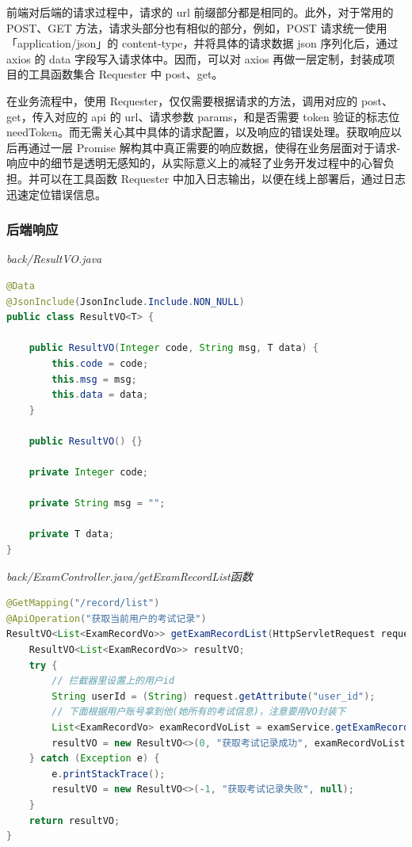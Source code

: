 前端对后端的请求过程中，请求的 url 前缀部分都是相同的。此外，对于常用的 POST、GET 方法，请求头部分也有相似的部分，例如，POST 请求统一使用「application/json」的 content-type，并将具体的请求数据 json 序列化后，通过 axios 的 data 字段写入请求体中。因而，可以对 axios 再做一层定制，封装成项目的工具函数集合 Requester 中 post、get。

在业务流程中，使用 Requester，仅仅需要根据请求的方法，调用对应的 post、get，传入对应的 api 的 url、请求参数 params，和是否需要 token 验证的标志位 needToken。而无需关心其中具体的请求配置，以及响应的错误处理。获取响应以后再通过一层 Promise 解构其中真正需要的响应数据，使得在业务层面对于请求-响应中的细节是透明无感知的，从实际意义上的减轻了业务开发过程中的心智负担。并可以在工具函数 Requester 中加入日志输出，以便在线上部署后，通过日志迅速定位错误信息。

\subsubsection{后端响应}
\noindent\textit{back/ResultVO.java}
\begin{lstlisting}[language=Java] 
@Data
@JsonInclude(JsonInclude.Include.NON_NULL) 
public class ResultVO<T> {

    public ResultVO(Integer code, String msg, T data) {
        this.code = code;
        this.msg = msg;
        this.data = data;
    }

    public ResultVO() {}

    private Integer code;

    private String msg = "";

    private T data;
}
\end{lstlisting}

\noindent\textit{back/ExamController.java/getExamRecordList函数}
\begin{lstlisting}[language=Java]
@GetMapping("/record/list")
@ApiOperation("获取当前用户的考试记录")
ResultVO<List<ExamRecordVo>> getExamRecordList(HttpServletRequest request) {
    ResultVO<List<ExamRecordVo>> resultVO;
    try {
        // 拦截器里设置上的用户id
        String userId = (String) request.getAttribute("user_id");
        // 下面根据用户账号拿到他(她所有的考试信息)，注意要用VO封装下
        List<ExamRecordVo> examRecordVoList = examService.getExamRecordList(userId);
        resultVO = new ResultVO<>(0, "获取考试记录成功", examRecordVoList);
    } catch (Exception e) {
        e.printStackTrace();
        resultVO = new ResultVO<>(-1, "获取考试记录失败", null);
    }
    return resultVO;
}
\end{lstlisting}

